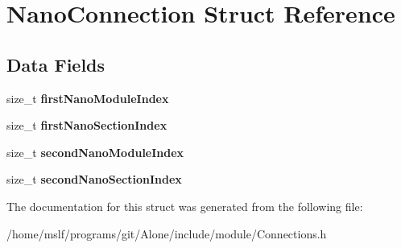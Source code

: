 \hypertarget{struct_nano_connection}{}\section{Nano\+Connection Struct Reference}
\label{struct_nano_connection}
\subsection*{Data Fields}
\begin{DoxyCompactItemize}
\item 
\hypertarget{struct_nano_connection_a96f8e0e51ad90654abfe1bd32e54b1a4}{}\label{struct_nano_connection_a96f8e0e51ad90654abfe1bd32e54b1a4} 
size\+\_\+t {\bfseries first\+Nano\+Module\+Index}
\item 
\hypertarget{struct_nano_connection_ae76497b1301d15956f7d8e5948fbe94b}{}\label{struct_nano_connection_ae76497b1301d15956f7d8e5948fbe94b} 
size\+\_\+t {\bfseries first\+Nano\+Section\+Index}
\item 
\hypertarget{struct_nano_connection_ac1ccc34a6f759813ea0ccb13e6316479}{}\label{struct_nano_connection_ac1ccc34a6f759813ea0ccb13e6316479} 
size\+\_\+t {\bfseries second\+Nano\+Module\+Index}
\item 
\hypertarget{struct_nano_connection_a4582e76650c52bbfc99ecc359b32e4cc}{}\label{struct_nano_connection_a4582e76650c52bbfc99ecc359b32e4cc} 
size\+\_\+t {\bfseries second\+Nano\+Section\+Index}
\end{DoxyCompactItemize}


The documentation for this struct was generated from the following file\+:\begin{DoxyCompactItemize}
\item 
/home/mslf/programs/git/\+Alone/include/module/Connections.\+h\end{DoxyCompactItemize}
